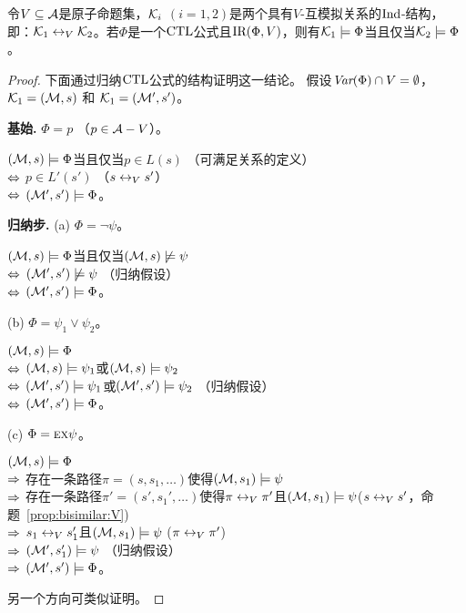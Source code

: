 \begin{theorem}\label{thm:V-bisimulation:EQ}
	令$V\subseteq {\cal A}$是原子命题集，${\cal K}_i$ $(i=1,2)$是两个具有$V$-互模拟关系的$\textrm{Ind}$-结构，即：${\cal K}_1 \leftrightarrow_V {\cal K}_2$。若$\Phi$是一个$\textrm{CTL}$公式且$\textrm{IR}(\Phi, V)$，则有${\cal K}_1\models \Phi$当且仅当${\cal K}_2\models \Phi$。
\end{theorem}
\begin{proof}
	下面通过归纳$\textrm{CTL}$公式的结构证明这一结论。
	假设$\textit{Var}(\Phi) \cap V=\emptyset$，${\cal K}_1=({\cal M},s)$ 和 ${\cal K}_1=({\cal M}',s')$。
	
	\textbf{基始.} $\Phi = p$ （$p\in {\cal A} -V$）。
	
	$({\cal M},s)\models \Phi$当且仅当$p\in L(s)$ \hfill （可满足关系的定义）\\
	$\Leftrightarrow$ $p\in L'(s')$ \hfill （$s \leftrightarrow_V s'$）\\
	$\Leftrightarrow$ $({\cal M}',s') \models \Phi$。
	
	\textbf{归纳步.} (a) $\Phi = \neg \psi$。
	
	$({\cal M},s)\models \Phi$当且仅当$({\cal M},s) \not \models \psi$\\
	$\Leftrightarrow$ $({\cal M}',s')\not \models \psi$  \hfill （归纳假设）\\
	$\Leftrightarrow$ $({\cal M}',s') \models \Phi$。
	
	(b) $\Phi = \psi_1 \vee \psi_2$。
	
	$({\cal M},s)\models \Phi$\\
	$\Leftrightarrow$ $({\cal M},s) \models \psi_1$或$({\cal M},s) \models \psi_2$\\
	$\Leftrightarrow$ $({\cal M}',s')  \models \psi_1$或$({\cal M}',s') \models \psi_2$ \hfill （归纳假设）\\
	$\Leftrightarrow$ $({\cal M}',s') \models \Phi$。
	
	(c) $\Phi=\textsc{e}\textsc{x}\psi$。
	
	$({\cal M},s)\models \Phi$\\
	$\Rightarrow$ 存在一条路径$\pi=(s,s_1,\dots)$使得$({\cal M},s_1)\models \psi$\\
	$\Rightarrow$ 存在一条路径$\pi'=(s',s_1',\dots)$使得$\pi \leftrightarrow_V \pi'$且$({\cal M},s_1)\models \psi$\hfill ($s \leftrightarrow_V s'$，命题~\ref{prop:bisimilar:V})\\
	$\Rightarrow$ $s_1 \leftrightarrow_V s_1'$且$({\cal M},s_1)\models \psi$ \hfill ($\pi \leftrightarrow_V \pi'$)\\
	$\Rightarrow$ $({\cal M}',s_1') \models \psi$   \hfill   （归纳假设）\\
	$\Rightarrow$ $({\cal M}',s')\models \Phi$。
	
	另一个方向可类似证明。
	

\end{proof}
